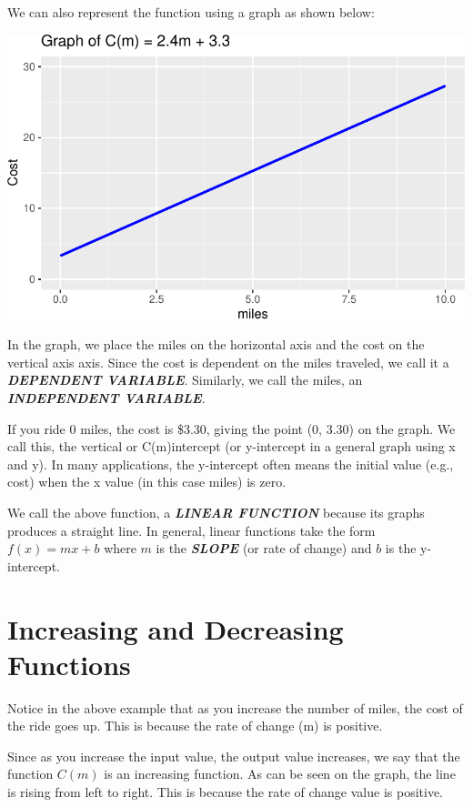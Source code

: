 \documentclass[
  letterpaper,
  DIV=11,
  numbers=noendperiod]{scrreprt}
\begin{document}
We can also represent the function using a graph as shown below:

\includegraphics{Linear_Functions_files/figure-pdf/unnamed-chunk-2-1.pdf}

In the graph, we place the miles on the horizontal axis and the cost on
the vertical axis axis. Since the cost is dependent on the miles
traveled, we call it a \textbf{\emph{DEPENDENT VARIABLE}}. Similarly, we
call the miles, an \textbf{\emph{INDEPENDENT VARIABLE}}.

If you ride 0 miles, the cost is \$3.30, giving the point (0, 3.30) on
the graph. We call this, the vertical or C(m)intercept (or y-intercept
in a general graph using x and y). In many applications, the y-intercept
often means the initial value (e.g., cost) when the x value (in this
case miles) is zero.

We call the above function, a \textbf{\emph{LINEAR FUNCTION}} because
its graphs produces a straight line. In general, linear functions take
the form \(f(x)=mx+b\) where \(m\) is the \textbf{\emph{SLOPE}} (or rate
of change) and \(b\) is the y-intercept.

\hypertarget{increasing-and-decreasing-functions}{%
\section{Increasing and Decreasing
Functions}\label{increasing-and-decreasing-functions}}

Notice in the above example that as you increase the number of miles,
the cost of the ride goes up. This is because the rate of change (m) is
positive.

Since as you increase the input value, the output value increases, we
say that the function \(C(m)\) is an increasing function. As can be seen
on the graph, the line is rising from left to right. This is because the
rate of change value is positive.
\end{document}
